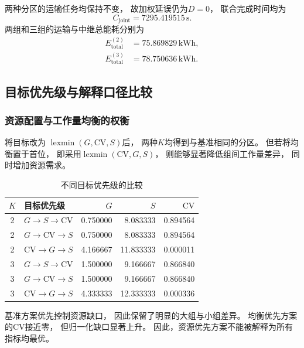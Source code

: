 \documentclass[bwprint]{gmcmthesis}
\begin{document}
两种分区的运输任务均保持不变，
故加权延误仍为$D=0$，
联合完成时间均为
\begin{equation}
C_{\mathrm{joint}}=7295.419515\,\mathrm{s}.
\end{equation}
两组和三组的运输与中继总能耗分别为
\begin{align}
E_{\mathrm{total}}^{(2)}
&=75.869829\,\mathrm{kWh},\\
E_{\mathrm{total}}^{(3)}
&=78.750636\,\mathrm{kWh}.
\end{align}

\subsection{目标优先级与解释口径比较}

\subsubsection{资源配置与工作量均衡的权衡}

将目标改为
$\operatorname{lexmin}(G,\mathrm{CV},S)$后，
两种$K$均得到与基准相同的分区。
但若将均衡置于首位，
即采用$\operatorname{lexmin}(\mathrm{CV},G,S)$，
则能够显著降低组间工作量差异，
同时增加资源需求。

\begin{table}[htbp]
\centering
\caption{不同目标优先级的比较}
\label{tab:q4_priority}
\begin{tabular}{clrrr}
\toprule
$K$ & 目标优先级 & $G$ & $S$ & $\mathrm{CV}$\\
\midrule
2 & $G\rightarrow S\rightarrow\mathrm{CV}$
  &0.750000&8.083333&0.894564\\
2 & $G\rightarrow\mathrm{CV}\rightarrow S$
  &0.750000&8.083333&0.894564\\
2 & $\mathrm{CV}\rightarrow G\rightarrow S$
  &4.166667&11.833333&0.000011\\
\midrule
3 & $G\rightarrow S\rightarrow\mathrm{CV}$
  &1.500000&9.166667&0.866840\\
3 & $G\rightarrow\mathrm{CV}\rightarrow S$
  &1.500000&9.166667&0.866840\\
3 & $\mathrm{CV}\rightarrow G\rightarrow S$
  &4.333333&12.333333&0.000336\\
\bottomrule
\end{tabular}
\end{table}

基准方案优先控制资源缺口，
因此保留了明显的大组与小组差异。
均衡优先方案的$\mathrm{CV}$接近零，
但归一化缺口显著上升。
因此，资源优先方案不能被解释为所有指标均最优。
\end{document}
